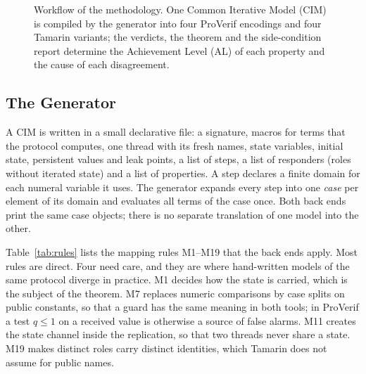 \begin{figure}[H]
\centering
{}
\caption{Workflow of the methodology. One Common Iterative Model (CIM) is compiled by the generator \cimc into four ProVerif encodings and four Tamarin variants; the verdicts, the theorem and the side-condition report determine the Achievement Level (AL) of each property and the cause of each disagreement.\label{fig:flow}}
\end{figure}

\subsection{The Generator}\label{sec:method:gen}

A CIM is written in a small declarative file: a signature, macros for terms that the protocol computes, one thread with its fresh names, state variables, initial state, persistent values and leak points, a list of steps, a list of responders (roles without iterated state) and a list of properties. A step declares a finite domain for each numeral variable it uses. The generator expands every step into one \emph{case} per element of its domain and evaluates all terms of the case once. Both back ends print the same case objects; there is no separate translation of one model into the other.

Table~\ref{tab:rules} lists the mapping rules M1--M19 that the back ends apply. Most rules are direct. Four need care, and they are where hand-written models of the same protocol diverge in practice. M1 decides how the state is carried, which is the subject of the theorem. M7 replaces numeric comparisons by case splits on public constants, so that a guard has the same meaning in both tools; in ProVerif a test $q \le 1$ on a received value is otherwise a source of false alarms. M11 creates the state channel inside the replication, so that two threads never share a state. M19 makes distinct roles carry distinct identities, which Tamarin does not assume for public names.

